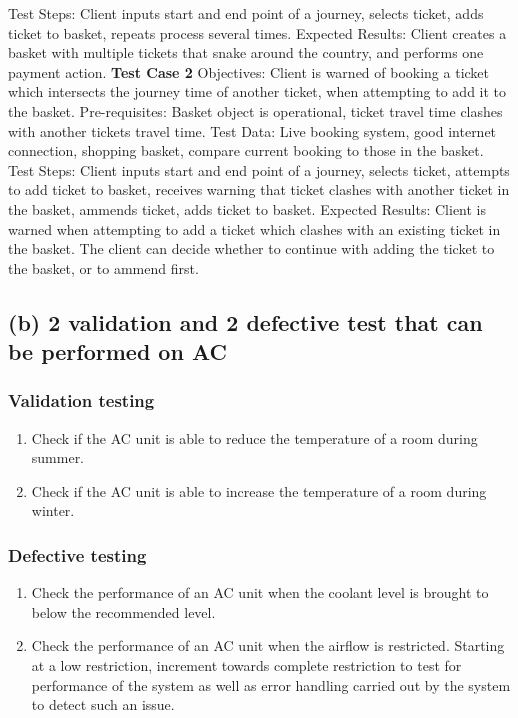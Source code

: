 \documentclass{article}
\begin{document}
\begin{enumerate}
		\subitem Test Steps: Client inputs start and end point of a journey, selects ticket, adds ticket to basket, repeats process several times.
		\subitem Expected Results: Client creates a basket with multiple tickets that snake around the country, and performs one payment action.
		\subitem \textbf{Test Case 2}
		\subitem Objectives: Client is warned of booking a ticket which intersects the journey time of another ticket, when attempting to add it to the basket.
		\subitem Pre-requisites: Basket object is operational, ticket travel time clashes with another tickets travel time.
		\subitem Test Data: Live booking system, good internet connection, shopping basket, compare current booking to those in the basket.
		\subitem Test Steps: Client inputs start and end point of a journey, selects ticket, attempts to add ticket to basket, receives warning that ticket clashes with another ticket in the basket, ammends ticket, adds ticket to basket.
		\subitem Expected Results: Client is warned when attempting to add a ticket which clashes with an existing ticket in the basket. The client can decide whether to continue with adding the ticket to the basket, or to ammend first.
\end{enumerate}
\subsection{(b) 2 validation and 2 defective test that can be performed on AC}
\subsubsection{Validation testing}
\begin{enumerate}
	\item Check if the AC unit is able to reduce the temperature of a room during summer.
	\item Check if the AC unit is able to increase the temperature of a room during winter.
\end{enumerate}
\subsubsection{Defective testing}
\begin{enumerate}
	\item Check the performance of an AC unit when the coolant level is brought to below the recommended level.
	\item Check the performance of an AC unit when the airflow is restricted. Starting at a low restriction, increment towards complete restriction to test for performance of the system as well as error handling carried out by the system to detect such an issue.
\end{enumerate}
\end{document}
